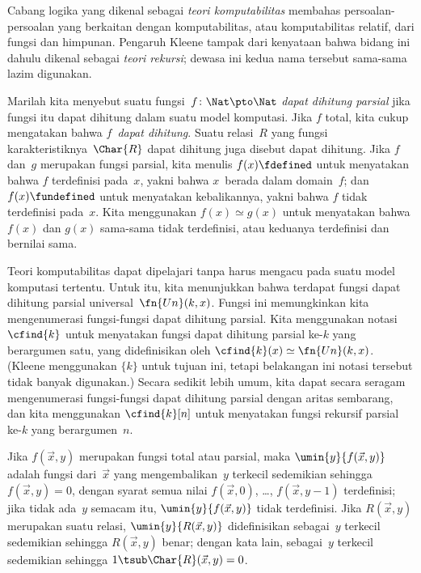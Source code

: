 \documentclass[../../../include/open-logic-section]{subfiles}
\begin{document}

Cabang logika yang dikenal sebagai \emph{teori komputabilitas} membahas
persoalan-persoalan yang berkaitan dengan komputabilitas, atau komputabilitas
relatif, dari fungsi dan himpunan. Pengaruh Kleene tampak dari kenyataan bahwa
bidang ini dahulu dikenal sebagai \emph{teori rekursi}; dewasa ini kedua nama
tersebut sama-sama lazim digunakan.

Marilah kita menyebut suatu fungsi~$f\colon \Nat \pto \Nat$ \emph{dapat
  dihitung parsial} jika fungsi itu dapat dihitung dalam suatu model komputasi.
Jika $f$ total, kita cukup mengatakan bahwa $f$~\emph{dapat dihitung}. Suatu
relasi~$R$ yang fungsi karakteristiknya~$\Char{R}$ dapat dihitung juga disebut
dapat dihitung. Jika $f$ dan~$g$ merupakan fungsi parsial, kita menulis
$f(x) \fdefined$ untuk menyatakan bahwa $f$ terdefinisi pada~$x$, yakni bahwa
$x$~berada dalam domain~$f$; dan $f(x) \fundefined$ untuk menyatakan
kebalikannya, yakni bahwa $f$ tidak terdefinisi pada~$x$. Kita menggunakan
$f(x) \simeq g(x)$ untuk menyatakan bahwa $f(x)$ dan $g(x)$ sama-sama tidak
terdefinisi, atau keduanya terdefinisi dan bernilai sama.

Teori komputabilitas dapat dipelajari tanpa harus mengacu pada suatu model
komputasi tertentu. Untuk itu, kita menunjukkan bahwa terdapat fungsi dapat
dihitung parsial universal~$\fn{Un}(k, x)$. Fungsi ini memungkinkan kita
mengenumerasi fungsi-fungsi dapat dihitung parsial. Kita menggunakan
notasi~$\cfind{k}$ untuk menyatakan fungsi dapat dihitung parsial ke-$k$ yang
berargumen satu, yang didefinisikan oleh
$\cfind{k}(x) \simeq \fn{Un}(k, x)$.
(Kleene menggunakan $\{ k \}$ untuk tujuan ini, tetapi belakangan ini notasi
tersebut tidak banyak digunakan.) Secara sedikit lebih umum, kita dapat secara
seragam mengenumerasi fungsi-fungsi dapat dihitung parsial dengan aritas
sembarang, dan kita menggunakan $\cfind{k}[n]$ untuk menyatakan fungsi rekursif
parsial ke-$k$ yang berargumen~$n$.

Jika $f(\vec x, y)$ merupakan fungsi total atau parsial, maka $\umin{y}{f
(\vec x, y)}$ adalah fungsi dari~$\vec x$ yang mengembalikan~$y$ terkecil
sedemikian sehingga $f(\vec x, y) = 0$, dengan syarat semua nilai
$f(\vec x, 0)$, \dots, $f(\vec x, y-1)$ terdefinisi; jika tidak ada~$y$
semacam itu, $\umin{y}{f (\vec x, y)}$ tidak terdefinisi. Jika
$R(\vec x, y)$ merupakan suatu relasi, $\umin{y}{R(\vec x, y)}$ didefinisikan
sebagai~$y$ terkecil sedemikian sehingga $R(\vec x, y)$ benar; dengan kata
lain, sebagai~$y$ terkecil sedemikian sehingga
$1 \tsub \Char{R}(\vec x, y) = 0$.
\end{document}
